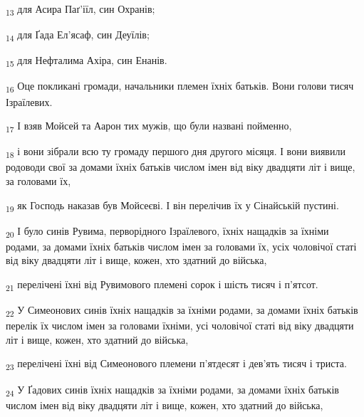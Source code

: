 \begin{tcolorbox}
\textsubscript{13} для Асира Паґ'іїл, син Охранів;
\end{tcolorbox}
\begin{tcolorbox}
\textsubscript{14} для Ґада Ел'ясаф, син Деуїлів;
\end{tcolorbox}
\begin{tcolorbox}
\textsubscript{15} для Нефталима Ахіра, син Енанів.
\end{tcolorbox}
\begin{tcolorbox}
\textsubscript{16} Оце покликані громади, начальники племен їхніх батьків. Вони голови тисяч Ізраїлевих.
\end{tcolorbox}
\begin{tcolorbox}
\textsubscript{17} І взяв Мойсей та Аарон тих мужів, що були названі пойменно,
\end{tcolorbox}
\begin{tcolorbox}
\textsubscript{18} і вони зібрали всю ту громаду першого дня другого місяця. І вони виявили родоводи свої за домами їхніх батьків числом імен від віку двадцяти літ і вище, за головами їх,
\end{tcolorbox}
\begin{tcolorbox}
\textsubscript{19} як Господь наказав був Мойсеєві. І він перелічив їх у Сінайській пустині.
\end{tcolorbox}
\begin{tcolorbox}
\textsubscript{20} І було синів Рувима, перворідного Ізраїлевого, їхніх нащадків за їхніми родами, за домами їхніх батьків числом імен за головами їх, усіх чоловічої статі від віку двадцяти літ і вище, кожен, хто здатний до війська,
\end{tcolorbox}
\begin{tcolorbox}
\textsubscript{21} перелічені їхні від Рувимового племені сорок і шість тисяч і п'ятсот.
\end{tcolorbox}
\begin{tcolorbox}
\textsubscript{22} У Симеонових синів їхніх нащадків за їхніми родами, за домами їхніх батьків перелік їх числом імен за головами їхніми, усі чоловічої статі від віку двадцяти літ і вище, кожен, хто здатний до війська,
\end{tcolorbox}
\begin{tcolorbox}
\textsubscript{23} перелічені їхні від Симеонового племени п'ятдесят і дев'ять тисяч і триста.
\end{tcolorbox}
\begin{tcolorbox}
\textsubscript{24} У Ґадових синів їхніх нащадків за їхніми родами, за домами їхніх батьків числом імен від віку двадцяти літ і вище, кожен, хто здатний до війська,
\end{tcolorbox}
